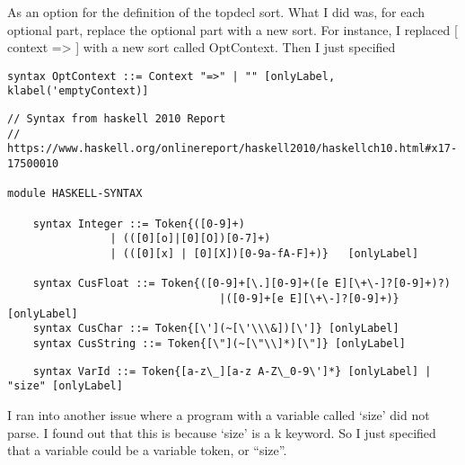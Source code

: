 As an option for the definition of the topdecl sort. What I did was, for each optional part, replace the optional part with a new sort. For instance, I replaced [ context => ] with a new sort called OptContext. Then I just specified
\begin{lstlisting}
syntax OptContext ::= Context "=>" | "" [onlyLabel, klabel('emptyContext)]
\end{lstlisting}
\begin{lstlisting}
// Syntax from haskell 2010 Report
// https://www.haskell.org/onlinereport/haskell2010/haskellch10.html#x17-17500010

module HASKELL-SYNTAX

    syntax Integer ::= Token{([0-9]+)
                | (([0][o]|[0][O])[0-7]+) 
                | (([0][x] | [0][X])[0-9a-fA-F]+)}   [onlyLabel]

    syntax CusFloat ::= Token{([0-9]+[\.][0-9]+([e E][\+\-]?[0-9]+)?)
                                 |([0-9]+[e E][\+\-]?[0-9]+)} [onlyLabel]
    syntax CusChar ::= Token{[\'](~[\'\\\&])[\']} [onlyLabel]
    syntax CusString ::= Token{[\"](~[\"\\]*)[\"]} [onlyLabel]
\end{lstlisting}
\begin{lstlisting}
    syntax VarId ::= Token{[a-z\_][a-z A-Z\_0-9\']*} [onlyLabel] | "size" [onlyLabel]
\end{lstlisting}
I ran into another issue where a program with a variable called ‘size’ did not parse. I found out that this is because ‘size’ is a k keyword. So I just specified that a variable could be a variable token, or “size”.
